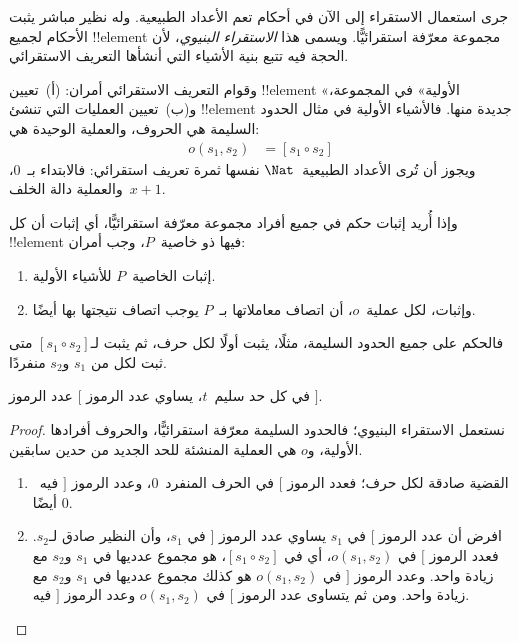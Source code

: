 \documentclass[../../../include/open-logic-section]{subfiles}
\begin{document}


جرى استعمال الاستقراء إلى الآن في أحكام تعم الأعداد الطبيعية. وله
نظير مباشر يثبت الأحكام لجميع !!{element} مجموعة معرّفة استقرائيًّا.
ويسمى هذا \emph{الاستقراء البنيوي}، لأن الحجة فيه تتبع بنية الأشياء
التي أنشأها التعريف الاستقرائي.

وقوام التعريف الاستقرائي أمران: (أ)~تعيين !!{element} «الأولية» في
المجموعة، و(ب)~تعيين العمليات التي تنشئ !!{element} جديدة منها.
فالأشياء الأولية في مثال الحدود السليمة هي الحروف، والعملية الوحيدة
هي:
\begin{align*}
  o(s_1, s_2) &= [s_1 \circ s_2]
\end{align*}
ويجوز أن تُرى الأعداد الطبيعية~$\Nat$ نفسها ثمرة تعريف استقرائي:
فالابتداء بـ~$0$، والعملية دالة الخلف~$x + 1$.

وإذا أُريد إثبات حكم في جميع أفراد مجموعة معرّفة استقرائيًّا، أي
إثبات أن كل !!{element} فيها ذو خاصية~$P$، وجب أمران:
\begin{enumerate}
\item إثبات الخاصية~$P$ للأشياء الأولية.
\item وإثبات، لكل عملية~$o$، أن اتصاف معاملاتها بـ~$P$ يوجب اتصاف
  نتيجتها بها أيضًا.
\end{enumerate}
فالحكم على جميع الحدود السليمة، مثلًا، يثبت أولًا لكل حرف، ثم يثبت
لـ$[s_1 \circ s_2]$ متى ثبت لكل من $s_1$ و$s_2$ منفردًا.

\begin{prop}
  في كل حد سليم~$t$، يساوي عدد الرموز $[$ عدد الرموز $]$.
\end{prop}

\begin{proof}
نستعمل الاستقراء البنيوي؛ فالحدود السليمة معرّفة استقرائيًّا، والحروف
أفرادها الأولية، و$o$ هي العملية المنشئة للحد الجديد من حدين سابقين.
\begin{enumerate}
\item القضية صادقة لكل حرف؛ فعدد الرموز $[$ في الحرف المنفرد~$0$،
  وعدد الرموز $]$ فيه~$0$ أيضًا.
\item افرض أن عدد الرموز $[$ في $s_1$ يساوي عدد الرموز $]$ في
  $s_1$، وأن النظير صادق لـ$s_2$. فعدد الرموز $[$ في
  $o(s_1, s_2)$، أي في $[s_1 \circ s_2]$، هو مجموع عدديها في
  $s_1$ و$s_2$ مع زيادة واحد. وعدد الرموز $]$ في
  $o(s_1, s_2)$ هو كذلك مجموع عدديها في $s_1$ و$s_2$ مع زيادة
  واحد. ومن ثم يتساوى عدد الرموز $[$ في $o(s_1, s_2)$ وعدد الرموز
  $]$ فيه.
\end{enumerate}
\end{proof}
\end{document}
